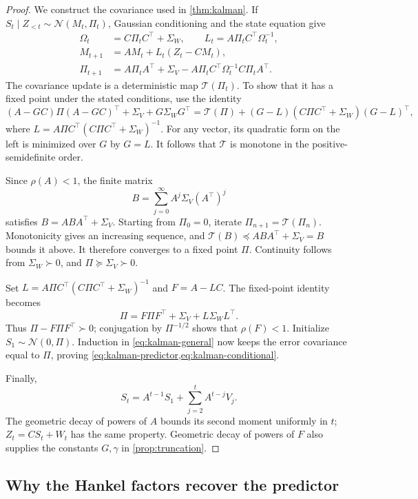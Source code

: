 \documentclass[11pt,twoside]{article}
\theoremstyle{definition}
\theoremstyle{remark}
\begin{document}
\kalmanpredictor*
\begin{proof}
We construct the covariance used in \cref{thm:kalman}.
If \(S_t\mid Z_{<t}\sim\mathcal N(M_t,\Pi_t)\), Gaussian conditioning
and the state equation give
\begin{align}
 \Omega_t&=C\Pi_tC^\top+\Sigma_W,\qquad
 L_t=A\Pi_tC^\top\Omega_t^{-1},\nonumber\\
 M_{t+1}&=AM_t+L_t(Z_t-CM_t),\label{eq:kalman-general}\\
 \Pi_{t+1}
 &=A\Pi_tA^\top+\Sigma_V
   -A\Pi_tC^\top\Omega_t^{-1}C\Pi_tA^\top.\nonumber
\end{align}
The covariance update is a deterministic map \(\mathcal T(\Pi_t)\).
To show that it has a fixed point under the stated conditions, use
the identity
\begin{equation}
 (A-GC)\Pi(A-GC)^\top+\Sigma_V+G\Sigma_WG^\top
 =\mathcal T(\Pi)+(G-L)(C\Pi C^\top+\Sigma_W)(G-L)^\top,
 \label{eq:riccati-minimum}
\end{equation}
where \(L=A\Pi C^\top(C\Pi C^\top+\Sigma_W)^{-1}\).
For any vector, its quadratic form on the left is minimized over
\(G\) by \(G=L\).
It follows that \(\mathcal T\) is monotone in the positive-semidefinite
order.

Since \(\rho(A)<1\), the finite matrix
\[
 B=\sum_{j=0}^{\infty}A^j\Sigma_V(A^\top)^j
\]
satisfies \(B=ABA^\top+\Sigma_V\).
Starting from \(\Pi_0=0\), iterate \(\Pi_{n+1}=\mathcal T(\Pi_n)\).
Monotonicity gives an increasing sequence, and
\(\mathcal T(B)\preceq ABA^\top+\Sigma_V=B\) bounds it above.
It therefore converges to a fixed point \(\Pi\).
Continuity follows from \(\Sigma_W\succ0\), and
\(\Pi\succeq\Sigma_V\succ0\).

Set \(L=A\Pi C^\top(C\Pi C^\top+\Sigma_W)^{-1}\) and \(F=A-LC\).
The fixed-point identity becomes
\[
 \Pi=F\Pi F^\top+\Sigma_V+L\Sigma_WL^\top.
\]
Thus \(\Pi-F\Pi F^\top\succ0\); conjugation by \(\Pi^{-1/2}\)
shows that \(\rho(F)<1\).
Initialize \(S_1\sim\mathcal N(0,\Pi)\).
Induction in \cref{eq:kalman-general} now keeps the error covariance
equal to \(\Pi\), proving \cref{eq:kalman-predictor,eq:kalman-conditional}.

Finally,
\[
 S_t=A^{t-1}S_1+\sum_{j=2}^t A^{t-j}V_j.
\]
The geometric decay of powers of \(A\) bounds its second moment
uniformly in \(t\); \(Z_t=CS_t+W_t\) has the same property.
Geometric decay of powers of \(F\) also supplies the constants
\(G,\gamma\) in \cref{prop:truncation}.
\end{proof}

\subsection{Why the Hankel factors recover the predictor}
\label{app:hankel}
\end{document}

